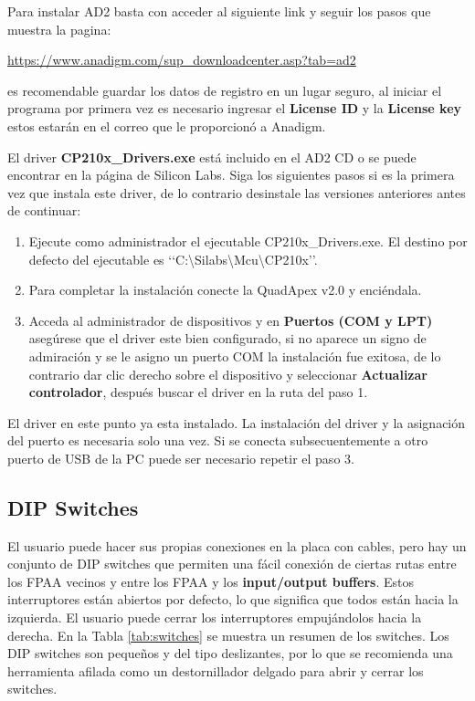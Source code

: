 Para instalar AD2 basta con acceder al siguiente link y seguir los pasos que muestra la pagina:

	\begin{center}
		\url{https://www.anadigm.com/sup_downloadcenter.asp?tab=ad2}
	\end{center}

es recomendable guardar los datos de registro en un lugar seguro, al iniciar el programa por primera vez es necesario ingresar el \textbf{License ID} y la \textbf{License key} estos estarán en el correo que le proporcionó a Anadigm. 

El driver \textbf{CP210x\_{}Drivers.exe} está incluido en el AD2 CD o se puede encontrar en la página de Silicon Labs. Siga los siguientes pasos si es la primera vez que instala este driver, de lo contrario desinstale las versiones anteriores antes de continuar:

\begin{enumerate}
	\item Ejecute como administrador el ejecutable  CP210x\_{}Drivers.exe. El destino por defecto del ejecutable es ‘‘C:\textbackslash{}Silabs\textbackslash{}Mcu\textbackslash{}CP210x’’.
	\item Para completar la instalación conecte la QuadApex v2.0 y enciéndala.
	\item Acceda al administrador de dispositivos y en \textbf{Puertos (COM y LPT)} asegúrese que el driver este bien configurado, si no aparece un signo de admiración y se le asigno un puerto COM  la instalación fue exitosa, de lo contrario dar clic derecho sobre el dispositivo y seleccionar \textbf{Actualizar controlador}, después buscar el  driver en la ruta del paso 1.
\end{enumerate}

El driver en este punto ya esta instalado. La instalación del driver y la asignación del puerto es necesaria solo una vez. Si se conecta subsecuentemente a otro puerto de USB de la PC puede ser necesario repetir el paso 3.

	\subsection{DIP Switches}
	
	El usuario puede hacer sus propias conexiones en la placa con cables, pero hay un conjunto de DIP switches que permiten una fácil conexión de ciertas rutas entre los FPAA vecinos y entre los FPAA y los \textbf{input/output buffers}. Estos interruptores están abiertos por defecto, lo que significa que todos están hacia la izquierda. El usuario puede cerrar los interruptores empujándolos hacia la derecha. En la Tabla \ref{tab:switches} se muestra un resumen de los switches. Los DIP switches son pequeños y del tipo deslizantes, por lo que se recomienda una herramienta afilada como un destornillador delgado para abrir y cerrar los switches.
	
